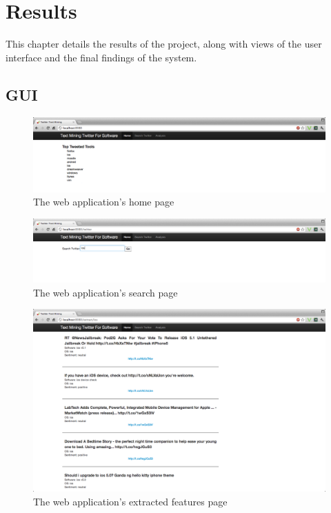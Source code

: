 \chapter{Results}
\label{cha:results}
This chapter details the results of the project, along with views of the user interface and the final findings of the system.

\section{GUI}

\begin{figure}[h]
\begin{center}
\includegraphics[width=15cm]{gui1}
\end{center}
\caption{The web application's home page}
\label{fig:gui1}
\end{figure}


\begin{figure}[h]
\begin{center}
\includegraphics[width=15cm]{gui2}
\end{center}
\caption{The web application's search page}
\label{fig:gui2}
\end{figure}

\begin{figure}[h]
\begin{center}
\includegraphics[width=15cm]{gui3}
\end{center}
\caption{The web application's extracted features page}
\label{fig:gui3}
\end{figure}


